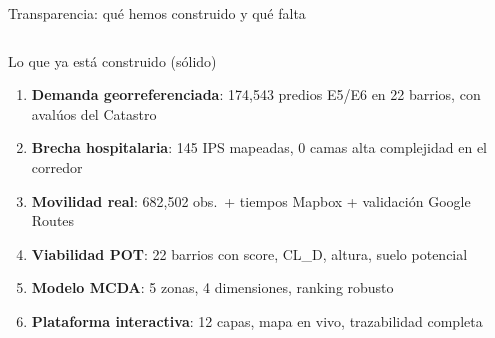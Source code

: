 \documentclass[aspectratio=169, 11pt]{beamer}
\begin{document}
\begin{frame}{Transparencia: qué hemos construido y qué falta}

\begin{columns}[T]
\begin{exampleblock}{\small Lo que ya está construido (sólido)}
\scriptsize
\begin{enumerate}\setlength{\itemsep}{1pt}
  \item[\textcolor{teal}{\checkmark}] \textbf{Demanda georreferenciada}: 174,543 predios E5/E6 en 22 barrios, con avalúos del Catastro
  \item[\textcolor{teal}{\checkmark}] \textbf{Brecha hospitalaria}: 145 IPS mapeadas, 0 camas alta complejidad en el corredor
  \item[\textcolor{teal}{\checkmark}] \textbf{Movilidad real}: 682,502 obs.\ + tiempos Mapbox + validación Google Routes
  \item[\textcolor{teal}{\checkmark}] \textbf{Viabilidad POT}: 22 barrios con score, CL\_D, altura, suelo potencial
  \item[\textcolor{teal}{\checkmark}] \textbf{Modelo MCDA}: 5 zonas, 4 dimensiones, ranking robusto
  \item[\textcolor{teal}{\checkmark}] \textbf{Plataforma interactiva}: 12 capas, mapa en vivo, trazabilidad completa
\end{enumerate}
\end{exampleblock}


\end{columns}
\end{frame}
\end{document}
